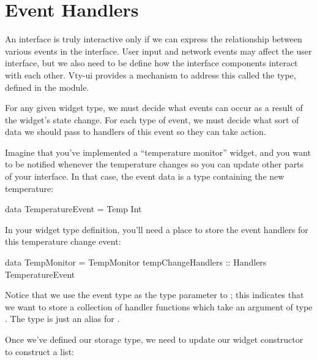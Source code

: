 \section{Event Handlers}
\label{sec:event_handlers}

An interface is truly interactive only if we can express the
relationship between various events in the interface.  User input and
network events may affect the user interface, but we also need to be
define how the interface components interact with each other.  Vty-ui
provides a mechanism to address this called the  type,
defined in the  module.

For any given widget type, we must decide what events can occur as a
result of the widget's state change.  For each type of event, we must
decide what sort of data we should pass to handlers of this event so
they can take action.

Imagine that you've implemented a ``temperature monitor'' widget, and
you want to be notified whenever the temperature changes so you can
update other parts of your interface.  In that case, the event data is
a type containing the new temperature:

\begin{haskellcode}
 data TemperatureEvent = Temp Int
\end{haskellcode}

In your widget type definition, you'll need a place to store the event
handlers for this temperature change event:

\begin{haskellcode}
 data TempMonitor =
   TempMonitor { tempChangeHandlers :: Handlers TemperatureEvent
               }
\end{haskellcode}

Notice that we use the event type as the type parameter to
; this indicates that we want to store a collection of
handler functions which take an argument of type
.  The  type is just an alias for
.

Once we've defined our storage type, we need to update our widget
constructor to construct a  list:


